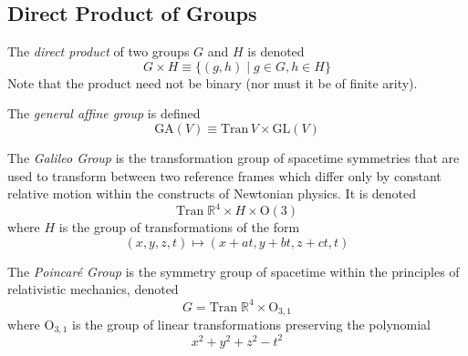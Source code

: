 \documentclass{article}
\begin{document}
  \subsection{Direct Product of Groups}

    \begin{definition}
      The \textit{direct product} of two groups $G$ and $H$ is denoted
      \begin{equation}
        G \times H \equiv \{ (g, h)\;|\; g \in G, h \in H \}
      \end{equation}
      Note that the product need not be binary (nor must it be of finite arity). 
    \end{definition}

    \begin{definition}
      The \textit{general affine group} is defined 
      \begin{equation}
        \text{GA}(V) \equiv \text{Tran}\,V \times \text{GL}(V)
      \end{equation}
    \end{definition}

    \begin{definition}
      The \textit{Galileo Group} is the transformation group of spacetime symmetries that are used to transform between two reference frames which differ only by constant relative motion within the constructs of Newtonian physics. It is denoted 
      \begin{equation}
        \text{Tran}\;\mathbb{R}^{4} \times H \times \text{O} (3)
      \end{equation}
      where $H$ is the group of transformations of the form 
      \begin{equation}
        (x, y, z, t) \longmapsto (x+at, y+bt, z+ct, t)
      \end{equation}
    \end{definition}

    \begin{definition}
      The \textit{Poincaré Group} is the symmetry group of spacetime within the principles of relativistic mechanics, denoted
      \begin{equation}
        G = \text{Tran}\; \mathbb{R}^{4} \times \text{O}_{3,1}
      \end{equation}
      where O$_{3,1}$ is the group of linear transformations preserving the polynomial 
      \begin{equation}
        x^{2} + y^{2} + z^{2} - t^{2}
      \end{equation}
    \end{definition}
\end{document}
